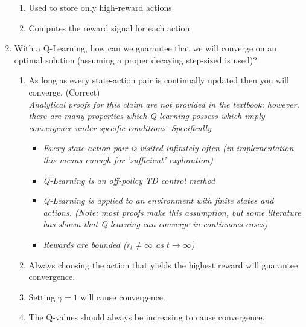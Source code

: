 \documentclass{exam}
\begin{document}
\begin{enumerate}
\begin{enumerate}
            \item Used to store only high-reward actions
            \item Computes the reward signal for each action
        \end{enumerate}
    \item With a Q-Learning, how can we guarantee that we will converge on an optimal solution (assuming a proper decaying step-sized is used)?
        \begin{enumerate}
            \item As long as every state-action pair is continually updated then you will converge. (Correct)\\
                \textit{Analytical proofs for this claim are not provided in the textbook; however, there are many properties which Q-learning possess which imply convergence under specific conditions. Specifically}
            \begin{itemize}
                \item \textit{Every state-action pair is visited infinitely often (in implementation this means enough for 'sufficient' exploration)}
                \item \textit{Q-Learning is an off-policy TD control method}
                \item \textit{Q-Learning is applied to an environment with finite states and actions. (Note: most proofs make this assumption, but some literature has shown that Q-learning can converge in continuous cases)}
                \item \textit{Rewards are bounded ($r_t \neq \infty$ as $t \to \infty$)}
            \end{itemize}
            \item Always choosing the action that yields the highest reward will guarantee convergence.
            \item Setting $\gamma = 1$ will cause convergence.
            \item The Q-values should always be increasing to cause convergence.
        \end{enumerate}
\end{enumerate}
\end{document}
